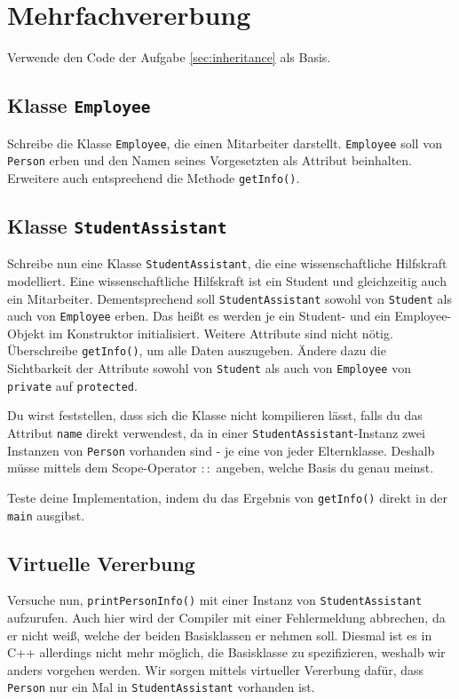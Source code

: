 \section{\ExercisePrefixObjectOrientation Mehrfachvererbung}
Verwende den Code der Aufgabe \ref{sec:inheritance} als Basis.

\subsection{Klasse \lstinline{Employee}}
Schreibe die Klasse \lstinline{Employee}, die einen Mitarbeiter darstellt.
\lstinline{Employee} soll von \lstinline{Person} erben und den Namen seines Vorgesetzten als Attribut beinhalten.
Erweitere auch entsprechend die Methode \lstinline{getInfo()}.

\subsection{Klasse \lstinline{StudentAssistant}}
Schreibe nun eine Klasse \lstinline{StudentAssistant}, die eine wissenschaftliche Hilfskraft modelliert.
Eine wissenschaftliche Hilfskraft ist ein Student und gleichzeitig auch ein Mitarbeiter.
Dementsprechend soll \lstinline{StudentAssistant} sowohl von \lstinline{Student} als auch von \lstinline{Employee} erben. Das heißt es werden je ein Student- und ein Employee-Objekt im Konstruktor initialisiert.
Weitere Attribute sind nicht nötig.
Überschreibe \lstinline{getInfo()}, um alle Daten auszugeben.
Ändere dazu die Sichtbarkeit der Attribute sowohl von \lstinline{Student} als auch von \lstinline{Employee} von \lstinline{private} auf \lstinline{protected}.

Du wirst feststellen, dass sich die Klasse nicht kompilieren lässt, falls du das Attribut \lstinline{name} direkt verwendest, da in einer \lstinline{StudentAssistant}-Instanz zwei Instanzen von \lstinline{Person} vorhanden sind - je eine von jeder Elternklasse. Deshalb müsse mittels dem Scope-Operator $::$ angeben, welche Basis du genau meinst.



Teste deine Implementation, indem du das Ergebnis von \lstinline{getInfo()} direkt in der \lstinline{main} ausgibst.

\subsection{Virtuelle Vererbung}
Versuche nun, \lstinline{printPersonInfo()} mit einer Instanz von \lstinline{StudentAssistant} aufzurufen. Auch hier wird der Compiler mit einer Fehlermeldung abbrechen, da er nicht weiß, welche der beiden Basisklassen er nehmen soll.
Diesmal ist es in C++ allerdings nicht mehr möglich, die Basisklasse zu spezifizieren, weshalb wir anders vorgehen werden.
Wir sorgen mittels virtueller Vererbung dafür, dass \lstinline{Person} nur ein Mal in \lstinline{StudentAssistant} vorhanden ist.

